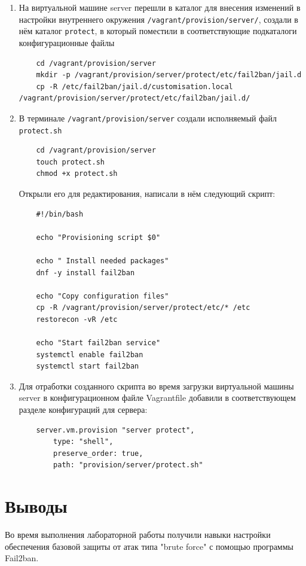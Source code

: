 \begin{enumerate}
\item На виртуальной машине server перешли в каталог для внесения изменений в настройки внутреннего окружения {\tt /vagrant/provision/server/}, создали в нём каталог {\tt protect}, в который поместили в соответствующие подкаталоги конфигурационные файлы 
\begin{verbatim}
    cd /vagrant/provision/server
    mkdir -p /vagrant/provision/server/protect/etc/fail2ban/jail.d
    cp -R /etc/fail2ban/jail.d/customisation.local /vagrant/provision/server/protect/etc/fail2ban/jail.d/
\end{verbatim}

\item В терминале {\tt /vagrant/provision/server} создали исполняемый файл {\tt protect.sh}

\begin{verbatim}
    cd /vagrant/provision/server
    touch protect.sh
    chmod +x protect.sh
\end{verbatim}

  Открыли его для редактирования, написали в нём следующий скрипт:

\begin{verbatim}
    #!/bin/bash

    echo "Provisioning script $0"

    echo " Install needed packages"
    dnf -y install fail2ban

    echo "Copy configuration files"
    cp -R /vagrant/provision/server/protect/etc/* /etc
    restorecon -vR /etc

    echo "Start fail2ban service"
    systemctl enable fail2ban
    systemctl start fail2ban
\end{verbatim}

\item Для отработки созданного скрипта во время загрузки виртуальной машины server в конфигурационном файле Vagrantfile добавили в соответствующем разделе конфигураций для сервера:

\begin{verbatim}
    server.vm.provision "server protect",
        type: "shell",
        preserve_order: true,
        path: "provision/server/protect.sh"
\end{verbatim}
\end{enumerate}


\section{Выводы}
Во время выполнения лабораторной работы получили навыки настройки обеспечения базовой защиты от атак типа "brute force" с помощью программы Fail2ban.

